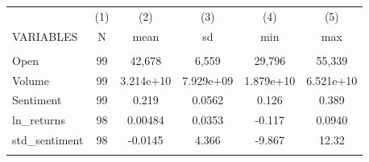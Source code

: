 \documentclass[]{article}
\begin{document}
\begin{tabular}{lccccc} \hline
 & (1) & (2) & (3) & (4) & (5) \\
VARIABLES & N & mean & sd & min & max \\ \hline
 &  &  &  &  &  \\
Open & 99 & 42,678 & 6,559 & 29,796 & 55,339 \\
Volume & 99 & 3.214e+10 & 7.929e+09 & 1.879e+10 & 6.521e+10 \\
Sentiment & 99 & 0.219 & 0.0562 & 0.126 & 0.389 \\
ln\_returns & 98 & 0.00484 & 0.0353 & -0.117 & 0.0940 \\
std\_sentiment & 98 & -0.0145 & 4.366 & -9.867 & 12.32 \\
 &  &  &  &  &  \\ \hline
\end{tabular}
\end{document}
